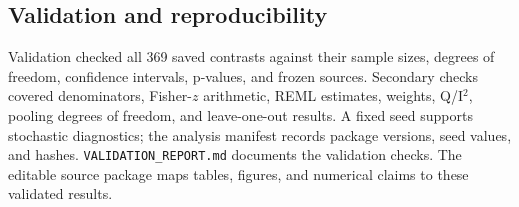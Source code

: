 \subsection{Validation and reproducibility}
Validation checked all 369 saved contrasts against their sample sizes, degrees of freedom, confidence intervals, p-values, and frozen sources. Secondary checks covered denominators, Fisher-$z$ arithmetic, REML estimates, weights, Q/I$^2$, pooling degrees of freedom, and leave-one-out results. A fixed seed supports stochastic diagnostics; the analysis manifest records package versions, seed values, and hashes. \texttt{VALIDATION\_REPORT.md} documents the validation checks. The editable source package maps tables, figures, and numerical claims to these validated results.

